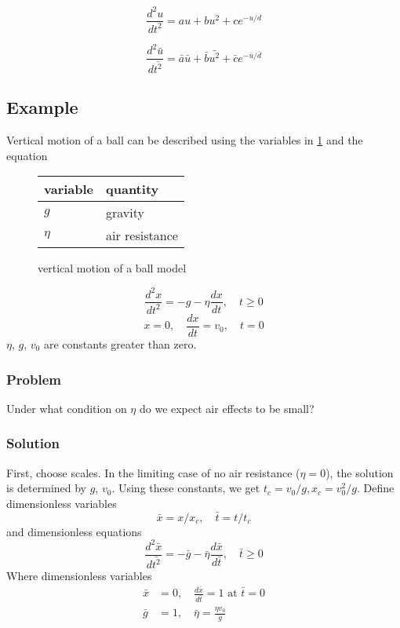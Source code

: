 \documentclass[12pt,twoside]{article}
\begin{document}
\begin{equation}
  \label{eq:dim-full-eq}
  \frac{d^2u}{dt^2} = au + bu^2 + ce^{-u/d}
\end{equation}

\begin{equation}
  \label{eq:dim-less-eq}
  \frac{d^2\bar{u}}{d\bar{t^2}} = \bar{a} \bar{u} + \bar{b} \bar{u^2} + \bar{c}e^{-\bar{u}/\bar{d}}
\end{equation}

\subsection{Example}
Vertical motion of a ball can be described using the variables in
\cref{fig:ball-model} and the equation

\begin{figure}
  \centering
  \begin{tabularx}{0.5\textwidth}{XX}
    variable & quantity \\ \hline
    $g$ & gravity \\
    $\eta$ & air resistance \\
  \end{tabularx}
  \caption{vertical motion of a ball model}
  \label{fig:ball-model}
\end{figure}

\begin{equation}
  \frac{d^2x}{dt^2} = -g - \eta\frac{dx}{dt}, \quad t\ge0
\end{equation}
\begin{equation}
  x=0,\quad \frac{dx}{dt} = v_0, \quad t=0
\end{equation}
$\eta$, $g$, $v_0$ are constants greater than zero.

\subsubsection*{Problem}
Under what condition on $\eta$ do we expect air effects to be small?

\subsubsection*{Solution}
First, choose scales. In the limiting case of no air resistance ($\eta=0$), the
solution is determined by $g$, $v_0$. Using these constants, we get
$t_c=v_0/g, x_c=v_0^2/g$. Define dimensionless variables
$$\bar{x}=x/x_c,\quad \bar{t}=t/t_c$$ and dimensionless
equations
\begin{equation}
  \frac{d^2\bar{x}}{d\bar{t^2}} = -\bar{g} -
  \bar{\eta}\frac{d\bar{x}}{d\bar{t}}, \quad \bar{t}\ge0
\end{equation}
Where dimensionless variables
\begin{equation}
  \begin{aligned}
    \bar{x} &= 0,\quad \frac{d\bar{x}}{d\bar{t}} = 1 \text{ at } \bar{t} = 0 \\
    \bar{g} &= 1, \quad \bar{\eta} = \frac{\eta v_0}{g} \\
  \end{aligned}
\end{equation}
\end{document}
